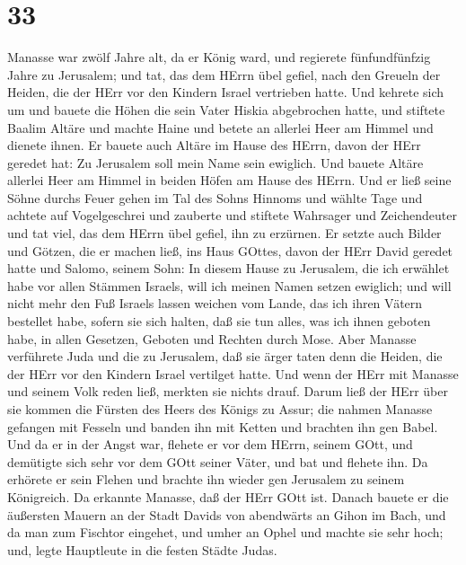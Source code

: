 \hypertarget{section-32}{%
\section{33}\label{section-32}}

 Manasse war zwölf Jahre alt, da er König ward, und
regierete fünfundfünfzig Jahre zu Jerusalem;  und tat, das
dem HErrn übel gefiel, nach den Greueln der Heiden, die der HErr vor den
Kindern Israel vertrieben hatte.  Und kehrete sich um und
bauete die Höhen die sein Vater Hiskia abgebrochen hatte, und stiftete
Baalim Altäre und machte Haine und betete an allerlei Heer am Himmel und
dienete ihnen.  Er bauete auch Altäre im Hause des HErrn,
davon der HErr geredet hat: Zu Jerusalem soll mein Name sein ewiglich.
 Und bauete Altäre allerlei Heer am Himmel in beiden Höfen
am Hause des HErrn.  Und er ließ seine Söhne durchs Feuer
gehen im Tal des Sohns Hinnoms und wählte Tage und achtete auf
Vogelgeschrei und zauberte und stiftete Wahrsager und Zeichendeuter und
tat viel, das dem HErrn übel gefiel, ihn zu erzürnen.  Er
setzte auch Bilder und Götzen, die er machen ließ, ins Haus GOttes,
davon der HErr David geredet hatte und Salomo, seinem Sohn: In diesem
Hause zu Jerusalem, die ich erwählet habe vor allen Stämmen Israels,
will ich meinen Namen setzen ewiglich;  und will nicht mehr
den Fuß Israels lassen weichen vom Lande, das ich ihren Vätern bestellet
habe, sofern sie sich halten, daß sie tun alles, was ich ihnen geboten
habe, in allen Gesetzen, Geboten und Rechten durch Mose. 
Aber Manasse verführete Juda und die zu Jerusalem, daß sie ärger taten
denn die Heiden, die der HErr vor den Kindern Israel vertilget hatte.
 Und wenn der HErr mit Manasse und seinem Volk reden ließ,
merkten sie nichts drauf.  Darum ließ der HErr über sie
kommen die Fürsten des Heers des Königs zu Assur; die nahmen Manasse
gefangen mit Fesseln und banden ihn mit Ketten und brachten ihn gen
Babel.  Und da er in der Angst war, flehete er vor dem
HErrn, seinem GOtt, und demütigte sich sehr vor dem GOtt seiner Väter,
 und bat und flehete ihn. Da erhörete er sein Flehen und
brachte ihn wieder gen Jerusalem zu seinem Königreich. Da erkannte
Manasse, daß der HErr GOtt ist.  Danach bauete er die
äußersten Mauern an der Stadt Davids von abendwärts an Gihon im Bach,
und da man zum Fischtor eingehet, und umher an Ophel und machte sie sehr
hoch; und, legte Hauptleute in die festen Städte Judas. 
